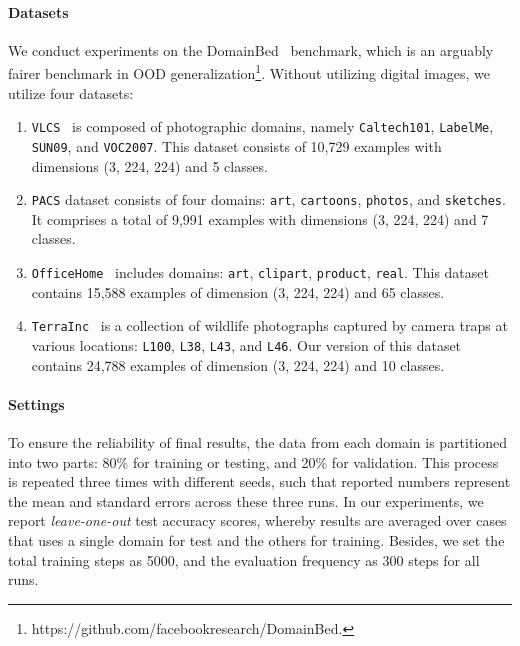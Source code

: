 \documentclass{article} \usepackage{iclr2024_conference,times}
\begin{document}
\paragraph{Datasets} We conduct experiments on the DomainBed~\citep{Setup:DomainBed} benchmark, which is an arguably fairer benchmark in OOD generalization\footnote{{{https://github.com/facebookresearch/DomainBed.}}}. Without utilizing digital images, we utilize four datasets: 
\begin{enumerate}
	\item \texttt{VLCS}~\citep{Dataset:VLCS}  is composed of photographic domains, namely \texttt{Caltech101}, \texttt{LabelMe}, \texttt{SUN09}, and \texttt{VOC2007}. This dataset consists of 10,729 examples with dimensions (3, 224, 224) and 5 classes.
	
	\item \texttt{PACS} dataset \citep{Dataset:PACS} consists of four domains: \texttt{art}, \texttt{cartoons}, \texttt{photos}, and \texttt{sketches}. It comprises a total of 9,991 examples with dimensions (3, 224, 224) and 7 classes.
	
	\item \texttt{OfficeHome}~\citep{Dataset:OfficeHome} includes domains: \texttt{art}, \texttt{clipart}, \texttt{product}, \texttt{real}. This
	dataset contains 15,588 examples of dimension (3, 224, 224) and 65 classes.
	
	\item \texttt{TerraInc}~\citep{Dataset:TerraIncognita} is a collection of wildlife photographs captured by camera traps at various locations: \texttt{L100}, \texttt{L38}, \texttt{L43}, and \texttt{L46}. Our version of this dataset contains 24,788 examples of dimension (3, 224, 224) and 10 classes.
\end{enumerate}





\paragraph{Settings} To ensure the reliability of final results, the data from each domain is partitioned into two parts: 80\% for training or testing, and 20\% for validation. This process is repeated three times with different seeds, such that reported numbers represent the mean and standard errors across these three runs. 
In our experiments, we report \textit{leave-one-out} test accuracy scores, whereby results are averaged over cases that uses a single domain for test and the others for training. 
Besides, we set the total training steps as 5000, and the evaluation frequency as 300 steps for all runs. 
\end{document}
